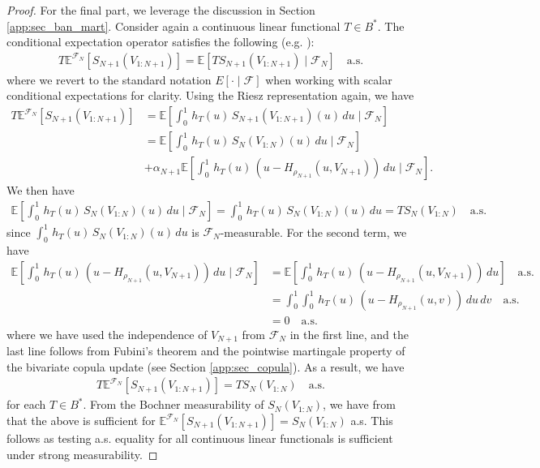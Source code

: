 \documentclass[11pt,a4paper]{article}
\newcommand{\E}{\mathbb{E}}
\begin{document}
\begin{appendices}
\begin{proof}
For the final part, we leverage the discussion in Section \ref{app:sec_ban_mart}. Consider again a continuous linear functional $T \in B^*$. The conditional expectation operator  satisfies the following (e.g. \citet[Remark 1.11]{Pisier2016}):
\begin{align*}
    T\E^{\mathcal{F}_N}[S_{N+1}(V_{1:N+1})] = \E[TS_{N+1}(V_{1:N+1})\mid \mathcal{F}_N] \quad \text{a.s.}
\end{align*}
where we revert to the standard notation $E[\cdot \mid \mathcal{F}]$ when working with scalar conditional expectations for clarity. Using the Riesz representation again, we have
\begin{align*}
    T\E^{\mathcal{F}_N}[S_{N+1}(V_{1:N+1})] &= \E\left[\int_0^1 \, h_T(u) \, S_{N+1}(V_{1:N+1})(u) \, du \mid \mathcal{F}_N\right]\\
    &= \E\left[\int_0^1 \, h_T(u) \, S_{N}(V_{1:N})(u) \, du \mid \mathcal{F}_N\right] \\
    &+ \alpha_{N+1}\E\left[\int_0^1 \, h_T(u) \,(u - H_{\rho_{N+1}}(u,V_{N+1})) \, du \mid \mathcal{F}_N\right].
\end{align*}
We then have
\begin{align*}
    \E\left[\int_0^1 \, h_T(u) \, S_{N}(V_{1:N})(u) \, du \mid \mathcal{F}_N\right] = \int_0^1 \, h_T(u) \, S_{N}(V_{1:N})(u) \, du = TS_N(V_{1:N}) \quad \text{a.s.}
\end{align*}
since $\int_0^1 \, h_T(u) \, S_{N}(V_{1:N})(u) \, du$ is $\mathcal{F}_N$-measurable. For the second term, we have
\begin{align*}
    \E\left[\int_0^1 \, h_T(u) \,(u - H_{\rho_{N+1}}(u,V_{N+1})) \, du \mid \mathcal{F}_N\right] &=  \E\left[\int_0^1 \, h_T(u) \,(u - H_{\rho_{N+1}}(u,V_{N+1})) \, du \right] \quad \text{a.s.}\\
    &= \int_0^1 \int_0^1 \, h_T(u) \,(u - H_{\rho_{N+1}}(u,v)) \, du\, dv   \quad \text{a.s.}\\
    &= 0 \quad \text{a.s.}
\end{align*}
where we have used the independence of $V_{N+1}$ from $\mathcal{F}_N$ in the first line, and the last line follows from Fubini's theorem and the pointwise martingale property of the bivariate copula update (see Section \ref{app:sec_copula}). As a result, we have
\begin{align*}
    T\E^{\mathcal{F}_N}[S_{N+1}(V_{1:N+1})] = TS_{N}(V_{1:N}) \quad \text{a.s.}
\end{align*}
for each $T \in B^*$. From the Bochner measurability of $S_N(V_{1:N})$, we have from \citet[Corollary 1.1.25]{Hytonen2016} that the above is sufficient for $\E^{\mathcal{F}_N}[S_{N+1}(V_{1:N+1})] = S_N(V_{1:N})$ a.s. This follows as testing a.s. equality for all continuous linear functionals is sufficient under strong measurability.
\end{proof}


\end{appendices}
\end{document}
